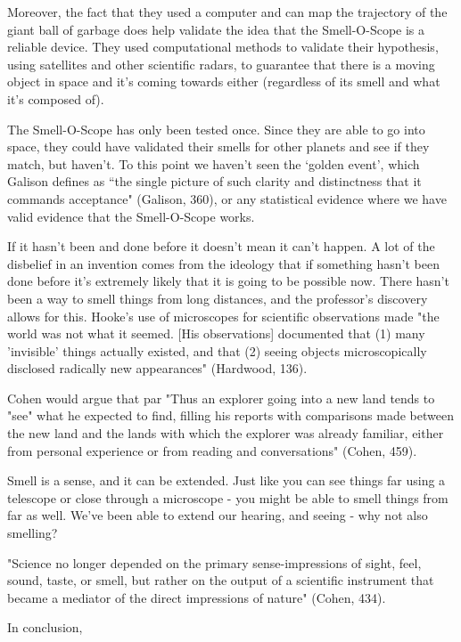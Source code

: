 \documentclass[11pt, oneside]{article}
\begin{document}

\par Moreover, the fact that they used a computer and can map the trajectory of the giant ball of garbage does help validate the idea that the Smell-O-Scope is a reliable device. They used computational methods to validate their hypothesis, using satellites and other scientific radars, to guarantee that there is a moving object in space and it's coming towards either (regardless of its smell and what it's composed of). 


\par The Smell-O-Scope has only been tested once. Since they are able to go into space, they could have validated their smells for other planets and see if they match, but haven't. To this point we haven't seen the `golden event', which Galison defines as ``the single picture of such clarity and distinctness that it commands acceptance" (Galison, 360), or any statistical evidence where we have valid evidence that the Smell-O-Scope works.

\par If it hasn't been and done before it doesn't mean it can't happen. A lot of the disbelief in an invention comes from the ideology that if something hasn't been done before it's extremely likely that it is going to be possible now. There hasn't been a way to smell things from long distances, and the professor's discovery allows for this. Hooke's use of microscopes for scientific observations made "the world was not what it seemed. [His observations] documented that (1) many 'invisible' things actually existed, and that (2) seeing objects microscopically disclosed radically new appearances" (Hardwood, 136). 

\par Cohen would argue that 
par "Thus an explorer going into a new land tends to "see" what he expected to find, filling his reports with comparisons made between the new land and the lands with which the explorer was already familiar, either from personal experience or from reading and conversations" (Cohen, 459). 

\par Smell is a sense, and it can be extended. Just like you can see things far using a telescope or close through a microscope - you might be able to smell things from far as well. We've been able to extend our hearing, and seeing - why not also smelling?
\par "Science no longer depended on the primary sense-impressions of sight, feel, sound, taste, or smell, but rather on the output of a scientific instrument that became a mediator of the direct impressions of nature" (Cohen, 434).

\par In conclusion, 
\end{document}
